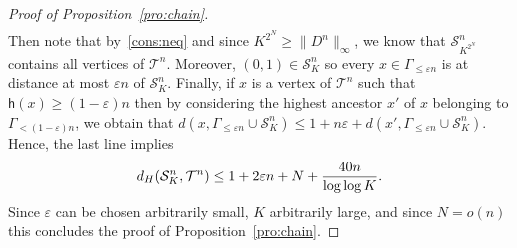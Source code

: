 \documentclass[AHL,Unicode,published]{cedram}
\newcommand{\e}{\varepsilon}
\newcommand{\1}{\mathbbm{1}}
\newcommand{\trail}{\mathcal{S}}
\newcommand{\T}{\mathcal{T}}
\newcommand{\h}{\mathsf{h}}
\let\originalleft\left
\let\originalright\right
\renewcommand{\left}{\mathopen{}\mathclose\bgroup\originalleft}
\renewcommand{\right}{\aftergroup\egroup\originalright}
\begin{document}
\begin{proof}[Proof of Proposition~\ref{pro:chain}]
\begin{multline*}
\end{multline*}
Then note that by~\ref{cons:neq} and since $K^{2^N}\geq \|D^n\|_\infty$, we know that $\trail_{K^{2^N}}^n$ contains all vertices of $\T^n$. Moreover, $(0,1)\in \trail_K^n$ so every $x\in \Gamma_{\leq \e n}$ is at distance at most $\e n$ of $\trail_K^n$. Finally, if $x$ is a vertex of $\T^n$ such that $\h (x) \ge (1-\e)n$ then by considering the highest ancestor $x'$ of $x$ belonging to $\Gamma_{<(1-\e)n}$, we obtain that $d(x,\Gamma_{\le \e n} \cup \trail^n_K) \le 1+ n\e +d(x',\Gamma_{\le \e n} \cup\trail^n_K)$. Hence, the last line implies
\[
d_H \left(\trail_K^n, \T^n \right) \leq 1+ 2\e n + N+\frac{40n}{\log \log K}.
\]
Since $\e$ can be chosen arbitrarily small, $K$ arbitrarily large, and since $N=o(n)$ this concludes the proof of Proposition~\ref{pro:chain}.
\end{proof}
\end{document}
